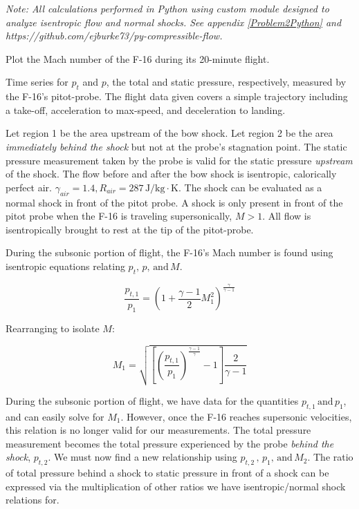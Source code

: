 \documentclass[../main.tex]{subfiles}
\begin{document}

\textit{Note: All calculations performed in Python using custom module designed to analyze isentropic flow and normal shocks. See appendix \ref{Problem2Python} and https://github.com/ejburke73/py-compressible-flow.}

 Plot the Mach number of the F-16 during its 20-minute flight.

\givens{}

Time series for \(p_t\) and \(p\), the total and static pressure, respectively, measured by the F-16's pitot-probe.
The flight data given covers a simple trajectory including a take-off, acceleration to max-speed, and deceleration to landing.

\assumptions{}

Let region 1 be the area upstream of the bow shock.
Let region 2 be the area \textit{immediately behind the shock} but not at the probe's stagnation point.
The static pressure measurement taken by the probe is valid for the static pressure \textit{upstream} of the shock.
The flow before and after the bow shock is isentropic, calorically perfect air. \(\gamma_{air} = 1.4, R_{air} = 287 \, \unit{\joule/\kilogram\cdot\kelvin}\).
The shock can be evaluated as a normal shock in front of the pitot probe.
A shock is only present in front of the pitot probe when the F-16 is traveling supersonically, \(M > 1\).
All flow is isentropically brought to rest at the tip of the pitot-probe.

\solution{}

During the subsonic portion of flight, the F-16's Mach number is found using isentropic equations relating \(p_t,\, p, \,\textrm{and} \, M\).

\[
    \frac{p_{t,1}}{p_1} = {\left({1 + \frac{\gamma-1}{2}M_1^2}\right)}^{\frac{\gamma}{\gamma-1}}
\]

Rearranging to isolate \(M\):

\[
    M_1 = \sqrt{
        \left[{{\left({\frac{p_{t,1}}{p_1}}\right)}^{\frac{\gamma-1}{\gamma}} - 1}\right]
        \frac{2}{\gamma-1}
    }
\]

During the subsonic portion of flight, we have data for the quantities \(p_{t,1} \, \textrm{and} \, p_1 \), and can easily solve for \(M_1\).
However, once the F-16 reaches supersonic velocities, this relation is no longer valid for our measurements. 
The total pressure measurement becomes the total pressure experienced by the probe \textit{behind the shock}, \(p_{t,2}\).
We must now find a new relationship using \(p_{t,2} \, , \, p_1 , \, \textrm{and} \, M_2\).
The ratio of total pressure behind a shock to static pressure in front of a shock can be expressed via the multiplication of other ratios we have isentropic/normal shock relations for.
\end{document}
